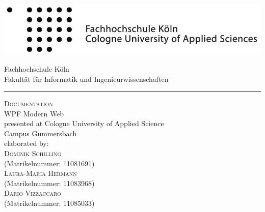 \documentclass[a4paper,12pt,oneside]{article} %
\begin{document}

  \pagestyle{empty}
  

  \begin{titlepage}
    \includegraphics[scale=1.00]{images/logo_fhkoeln_sw}\\
    \begin{center}
      \Large
      Fachhochschule Köln\\
      Fakultät für Informatik und Ingenieurwissenschaften\\
      \hrule\par\rule{0pt}{2cm} %
      \LARGE
      \textsc{Documentation}\\
      \vspace{1cm} %
      \huge
      WPF Modern Web\\
      \Large
      \vspace{1.5cm}
      \large
      presented at Cologne University of Applied Science\\
      Campus Gummersbach\\
      \vspace{1.0cm}
      elaborated by:\\
      \textsc{Dominik Schilling}\\
      (Matrikelnummer: 11081691)\\
      \textsc{Laura-Maria Hermann}\\
      (Matrikelnummer: 11083968)\\
      \textsc{Dario Vizzaccaro}\\
      (Matrikelnummer: 11085033)\\
      \vspace{1.5cm}
      \vspace{1.5cm}

    \end{center}
  \end{titlepage}

  \newpage


  \tableofcontents
	\pagestyle{fancy}
\end{document}
